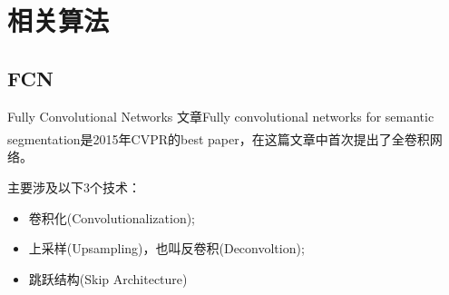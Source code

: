 \documentclass{beamer}
\newcommand{\upcite}[1]{\textsuperscript{\textsuperscript{\cite{#1}}}}
\begin{document}
\section{相关算法}

\subsection{FCN}
\begin{frame}{Fully Convolutional Networks}
文章Fully convolutional networks for semantic segmentation\upcite{long2015fully}是2015年CVPR的best paper，在这篇文章中首次提出了全卷积网络。

主要涉及以下3个技术：
\begin{itemize}
	\item 卷积化(Convolutionalization);
	\item 上采样(Upsampling)，也叫反卷积(Deconvoltion);
	\item 跳跃结构(Skip Architecture)
\end{itemize}
\end{frame}
\end{document}
